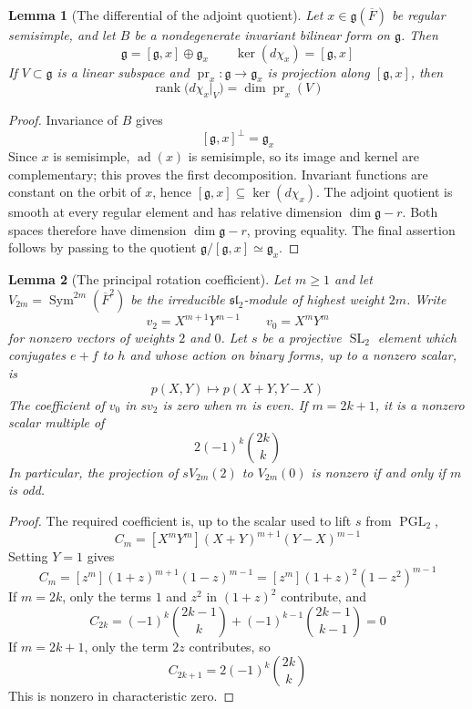 \documentclass[11pt]{amsart}
\newtheorem{lemma}[lemma]{Lemma}
\theoremstyle{definition}
\theoremstyle{remark}
\newcommand{\Fb}{\overline F}
\newcommand{\ad}{\operatorname{ad}}
\newcommand{\rank}{\operatorname{rank}}
\newcommand{\SL}{\operatorname{SL}}
\newcommand{\g}{\mathfrak g}
\newcommand{\slie}{\mathfrak{sl}}
\begin{document}
\begin{lemma}[The differential of the adjoint quotient]
\label{lem:quotient-differential}
Let $x\in\g(\Fb)$ be regular semisimple, and let $B$ be a nondegenerate
invariant bilinear form on $\g$.  Then
\[
 \g=[\g,x]\oplus\g_x
 \qquad
 \ker(d\chi_x)=[\g,x]
\]
If $V\subset\g$ is a linear subspace and
$\operatorname{pr}_x:\g\to\g_x$ is projection along $[\g,x]$, then
\[
 \rank\bigl(d\chi_x|_V\bigr)=\dim\operatorname{pr}_x(V)
\]
\end{lemma}

\begin{proof}
Invariance of $B$ gives
\[
 [\g,x]^\perp=\g_x
\]
Since $x$ is semisimple, $\ad(x)$ is semisimple, so its image and kernel are
complementary; this proves the first decomposition.  Invariant functions are
constant on the orbit of $x$, hence
$[\g,x]\subseteq\ker(d\chi_x)$.  The adjoint quotient is smooth at every
regular element and has relative dimension $\dim\g-r$.  Both spaces therefore
have dimension $\dim\g-r$, proving equality.  The final assertion follows by
passing to the quotient $\g/[\g,x]\simeq\g_x$.
\end{proof}

\begin{lemma}[The principal rotation coefficient]
\label{lem:principal-rotation}
Let $m\geq1$ and let $V_{2m}=\operatorname{Sym}^{2m}(\Fb^2)$ be the
irreducible $\slie_2$-module of highest weight $2m$.  Write
\[
 v_2=X^{m+1}Y^{m-1}
 \qquad
 v_0=X^mY^m
\]
for nonzero vectors of weights $2$ and $0$.  Let $s$ be a projective
$\SL_2$ element which conjugates $e+f$ to $h$ and whose action on binary forms,
up to a nonzero scalar, is
\[
 p(X,Y)\longmapsto p(X+Y,Y-X)
\]
The coefficient of $v_0$ in $s v_2$ is zero when $m$ is even.  If
$m=2k+1$, it is a nonzero scalar multiple of
\[
 2(-1)^k\binom{2k}{k}
\]
In particular, the projection of $sV_{2m}(2)$ to $V_{2m}(0)$ is nonzero if
and only if $m$ is odd.
\end{lemma}

\begin{proof}
The required coefficient is, up to the scalar used to lift $s$ from
$\operatorname{PGL}_2$,
\[
 C_m=[X^mY^m](X+Y)^{m+1}(Y-X)^{m-1}
\]
Setting $Y=1$ gives
\[
 C_m=[z^m](1+z)^{m+1}(1-z)^{m-1}
     =[z^m](1+z)^2(1-z^2)^{m-1}
\]
If $m=2k$, only the terms $1$ and $z^2$ in $(1+z)^2$ contribute, and
\[
 C_{2k}=(-1)^k\binom{2k-1}{k}
       +(-1)^{k-1}\binom{2k-1}{k-1}=0
\]
If $m=2k+1$, only the term $2z$ contributes, so
\[
 C_{2k+1}=2(-1)^k\binom{2k}{k}
\]
This is nonzero in characteristic zero.
\end{proof}
\end{document}
